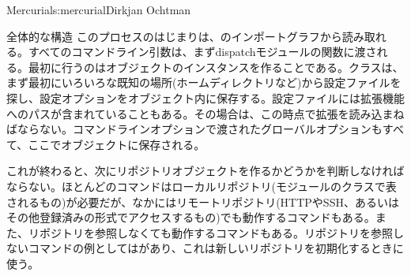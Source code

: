 \begin{aosachapter}{Mercurial}{s:mercurial}{Dirkjan Ochtman}
\begin{aosasect1}{全体的な構造}
このプロセスのはじまりは、のインポートグラフから読み取れる。すべてのコマンドライン引数は、まずdispatchモジュールの関数に渡される。最初に行うのはオブジェクトのインスタンスを作ることである。クラスは、まず最初にいろいろな既知の場所(ホームディレクトリなど)から設定ファイルを探し、設定オプションをオブジェクト内に保存する。設定ファイルには拡張機能へのパスが含まれていることもある。その場合は、この時点で拡張を読み込まねばならない。コマンドラインオプションで渡されたグローバルオプションもすべて、ここでオブジェクトに保存される。

これが終わると、次にリポジトリオブジェクトを作るかどうかを判断しなければならない。ほとんどのコマンドはローカルリポジトリ(モジュールのクラスで表されるもの)が必要だが、なかにはリモートリポジトリ(HTTPやSSH、あるいはその他登録済みの形式でアクセスするもの)でも動作するコマンドもある。また、リポジトリを参照しなくても動作するコマンドもある。リポジトリを参照しないコマンドの例としてはがあり、これは新しいリポジトリを初期化するときに使う。


\end{aosasect1}
\end{aosachapter}
